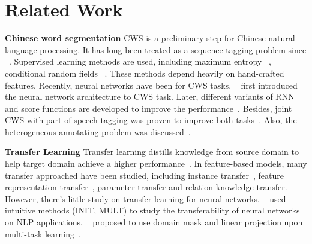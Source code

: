\section{Related Work}

\textbf{Chinese word segmentation} \quad CWS is a preliminary step for Chinese natural language processing. It has long been treated as a sequence tagging problem since ~\cite{xue2003chinese}. Supervised learning methods are used, including maximum entropy ~\cite{low2005maximum}, conditional random fields ~\cite{lafferty2001conditional,Peng:2004:CSN:1220355.1220436,DBLP:conf/paclic/ZhaoHLL06}. These methods depend heavily on hand-crafted features. Recently, neural networks have been for CWS tasks. ~\citet{DBLP:conf/emnlp/ZhengCX13} first introduced the neural network architecture to CWS task. Later, different variants of RNN and score functions are developed to improve the performance~\cite{DBLP:conf/acl/PeiGC14,DBLP:conf/emnlp/ChenQZLH15,DBLP:conf/acl/ChenQZH15,DBLP:journals/corr/CaiZ16,DBLP:conf/acl/CaiZZXWH17}.
 Besides, joint CWS with part-of-speech tagging was proven to improve both tasks~\cite{DBLP:journals/corr/ChenQH16a,DBLP:conf/ijcai/ChenQH17}. Also, the heterogeneous annotating problem was discussed~\cite{DBLP:conf/emnlp/QiuZH13,DBLP:conf/acl/ChenSQH17}.

\noindent \textbf{Transfer Learning} \quad Transfer learning distills knowledge from source domain to help target domain achieve a higher performance~\cite{Pan:2010:STL:1850483.1850545}. In feature-based models, many transfer approached have been studied, including instance transfer~\cite{DBLP:conf/acl/JiangZ07,DBLP:conf/icml/LiaoXC05}, feature representation transfer~\cite{DBLP:conf/nips/ArgyriouEP06,DBLP:conf/nips/ArgyriouMPY07}, parameter transfer\cite{DBLP:conf/icml/LawrenceP04,DBLP:conf/nips/BonillaCW07} and relation knowledge transfer\cite{DBLP:conf/aaai/MihalkovaHM07,Mihalkova09transferlearning}. However, there's little study on transfer learning for neural networks. ~\cite{DBLP:journals/corr/MouMYLXZJ16} used intuitive methods (INIT, MULT) to study the transferability of neural networks on NLP applications. ~\citet{DBLP:journals/corr/PengD16a} proposed to use domain mask and linear projection upon multi-task learning~\cite{DBLP:journals/corr/Long015a}.